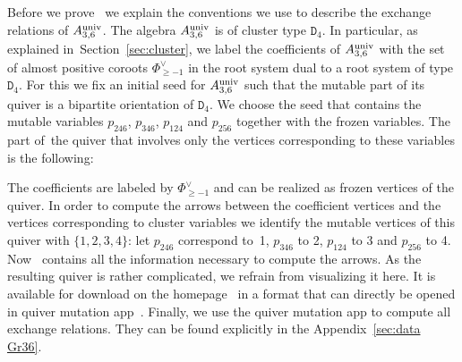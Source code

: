 \documentclass[pdftex]{sigma}%
\numberwithin{equation}{section}
\begin{document}
Before we prove~ we explain the conventions we use to describe the exchange relations of $A_{3,6}^{\rm univ}$.
The algebra $A_{3,6}^{\rm univ}$ is of cluster type $\mathtt D_4$.
In particular, as explained in~Section~\ref{sec:cluster}, we label the coefficients of $A_{3,6}^{\rm univ}$ with the set of almost positive coroots $\Phi^{\vee}_{\geq -1} $ in the root system dual to a root system of type $\mathtt{D}_4$.
For this we fix an initial seed for $A_{3,6}^{\rm univ}$ such that the mutable part of its quiver is a bipartite orientation of $\mathtt{D}_4$.
We choose the seed that contains the mutable variables $p_{246}$, $p_{346}$, $p_{124}$ and $p_{256}$ together with the frozen variables. The part of~the quiver that involves only the vertices corresponding to these variables is the following:
\begin{center}
\end{center}
The coefficients are labeled by $\Phi^{\vee}_{\geq -1}$ and can be realized as frozen vertices of the quiver.
In order to compute the arrows between the coefficient vertices and the vertices corresponding to cluster variables we identify the mutable vertices of this quiver with $\{ 1, 2, 3, 4 \}$:
let $p_{246}$ correspond to~1, $p_{346}$ to 2, $p_{124}$ to 3 and $p_{256}$ to 4.
Now~ contains all the information necessary to compute the arrows.
As the resulting quiver is rather complicated, we refrain from visualizing it here.
It is available for download on the homepage~\cite{homepage} in a format that can directly be opened in quiver mutation app~\cite{Qmut}.
Finally, we use the quiver mutation app to compute all exchange relations. They can be found explicitly in the Appendix~\ref{sec:data Gr36}.
\end{document}
